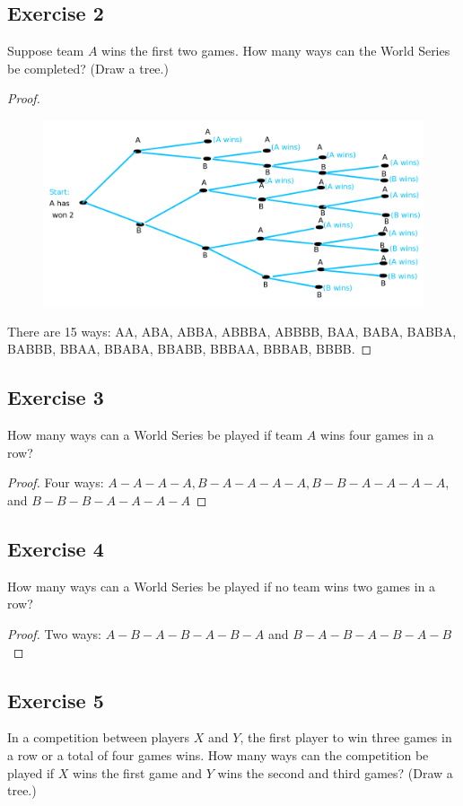 \documentclass[14pt]{extarticle}
\begin{document}
\subsection{Exercise 2}
Suppose team $A$ wins the first two games. How many ways can the World Series be completed? (Draw a tree.)

\begin{proof}
\begin{figure}[ht!]
\centering
\includegraphics[scale=0.25]{../images/9.2.2.png}
\end{figure}

There are 15 ways: AA, ABA, ABBA, ABBBA, ABBBB, BAA, BABA, BABBA, BABBB, BBAA, BBABA, BBABB, BBBAA, BBBAB, BBBB.
\end{proof}

\subsection{Exercise 3}
How many ways can a World Series be played if team $A$ wins four games in a row?

\begin{proof}
Four ways: \(A-A-A-A, B-A-A-A-A, B-B-A-A-A-A\), and \(B-B-B-A-A-A-A\)
\end{proof}

\subsection{Exercise 4}
How many ways can a World Series be played if no team wins two games in a row?

\begin{proof}
Two ways: \(A-B-A-B-A-B-A\) and \(B-A-B-A-B-A-B\)
\end{proof}

\subsection{Exercise 5}
In a competition between players $X$ and $Y$, the first player to win three games in a row or a total of four games 
wins. How many ways can the competition be played if $X$ wins the first game and $Y$ wins the second and third 
games? (Draw a tree.)
\end{document}
